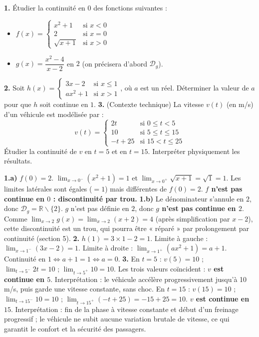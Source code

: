 \documentclass[11pt]{article}
\def\setminus{\mathbin{\backslash}}\let\smallsetminus\setminus
\begin{document}
\begin{exercice}
\textbf{1.} Étudier la continuité en $0$ des fonctions suivantes :
\begin{itemize}
    \item[a)] $f(x) = \begin{cases} x^2+1 & \text{si } x<0 \\ 2 & \text{si } x=0 \\ \sqrt{x+1} & \text{si } x>0 \end{cases}$
    \item[b)] $g(x) = \dfrac{x^2-4}{x-2}$ en $2$ (on précisera d'abord $\mathcal{D}_g$).
\end{itemize}
\textbf{2.} Soit $h(x) = \begin{cases} 3x-2 & \text{si } x \le 1 \\ ax^2+1 & \text{si } x > 1 \end{cases}$, où $a$ est un réel.
Déterminer la valeur de $a$ pour que $h$ soit continue en $1$.
\textbf{3.} (Contexte technique) La vitesse $v(t)$ (en m/s) d'un véhicule est modélisée par :
\[
v(t) = \begin{cases} 2t & \text{si } 0 \le t < 5 \\ 10 & \text{si } 5 \le t \le 15 \\ -t+25 & \text{si } 15 < t \le 25 \end{cases}
\]
Étudier la continuité de $v$ en $t=5$ et en $t=15$. Interpréter physiquement les résultats.
\end{exercice}

\begin{corrige}
\textbf{1.a)} $f(0)=2$. $\lim_{x\to 0^-}(x^2+1)=1$ et $\lim_{x\to 0^+}\sqrt{x+1}=\sqrt{1}=1$. Les limites latérales sont égales ($=1$) mais différentes de $f(0)=2$. \textbf{$f$ n'est pas continue en $0$ : discontinuité par trou.}
\textbf{1.b)} Le dénominateur s'annule en $2$, donc $\mathcal{D}_g = \mathbb{R}\setminus\{2\}$. $g$ n'est pas définie en $2$, donc \textbf{$g$ n'est pas continue en $2$}. Comme $\lim_{x\to 2}g(x)=\lim_{x\to 2}(x+2)=4$ (après simplification par $x-2$), cette discontinuité est un trou, qui pourra être « réparé » par prolongement par continuité (section 5).
\textbf{2.} $h(1)=3\times1-2=1$. Limite à gauche : $\lim_{x\to 1^-}(3x-2)=1$. Limite à droite : $\lim_{x\to 1^+}(ax^2+1)=a+1$. Continuité en $1 \iff a+1=1 \iff a=0$.
\textbf{3.} En $t=5$ : $v(5)=10$ ; $\lim_{t\to 5^-}2t=10$ ; $\lim_{t\to 5^+}10=10$. Les trois valeurs coïncident : \textbf{$v$ est continue en $5$}. Interprétation : le véhicule accélère progressivement jusqu'à 10 m/s, puis garde une vitesse constante, sans choc.
En $t=15$ : $v(15)=10$ ; $\lim_{t\to 15^-}10=10$ ; $\lim_{t\to 15^+}(-t+25)=-15+25=10$. \textbf{$v$ est continue en $15$}. Interprétation : fin de la phase à vitesse constante et début d'un freinage progressif ; le véhicule ne subit aucune variation brutale de vitesse, ce qui garantit le confort et la sécurité des passagers.
\end{corrige}
\end{document}
